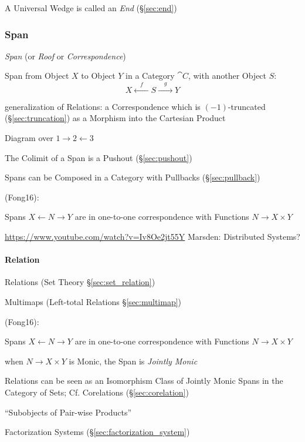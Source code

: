A Universal Wedge is called an \emph{End} (\S\ref{sec:end})



\subsubsection{Span}\label{sec:span}

\emph{Span} (or \emph{Roof} or \emph{Correspondence})

Span from Object $X$ to Object $Y$ in a Category $\cat{C}$, with
another Object $S$:
\[
  X \xleftarrow{\quad f \quad} S \xrightarrow{\quad g \quad} Y
\]

generalization of Relations: a Correspondence which is
$(-1)$-truncated (\S\ref{sec:truncation}) as a Morphism into the
Cartesian Product

Diagram over $1 \rightarrow 2 \leftarrow 3$

The Colimit of a Span is a Pushout (\S\ref{sec:pushout})

Spans can be Composed in a Category with Pullbacks
(\S\ref{sec:pullback})

(Fong16):

Spans $X \leftarrow N \rightarrow Y$ are in one-to-one correspondence
with Functions $N \rightarrow X \times Y$

\url{https://www.youtube.com/watch?v=Iv8Oe2jt55Y} Marsden: Distributed
Systems? %



\paragraph{Relation}\label{sec:relation}\hfill

\fist Relations (Set Theory \S\ref{sec:set_relation})

\fist Multimaps (Left-total Relations \S\ref{sec:multimap})

(Fong16):

Spans $X \leftarrow N \rightarrow Y$ are in one-to-one correspondence
with Functions $N \rightarrow X \times Y$

when $N \rightarrow X \times Y$ is Monic, the Span is \emph{Jointly
  Monic}

Relations can be seen as an Isomorphism Class of Jointly Monic Spans
in the Category of Sets; \fist Cf. Corelations
(\S\ref{sec:corelation})

``Subobjects of Pair-wise Products'' %

Factorization Systems (\S\ref{sec:factorization_system}) %

